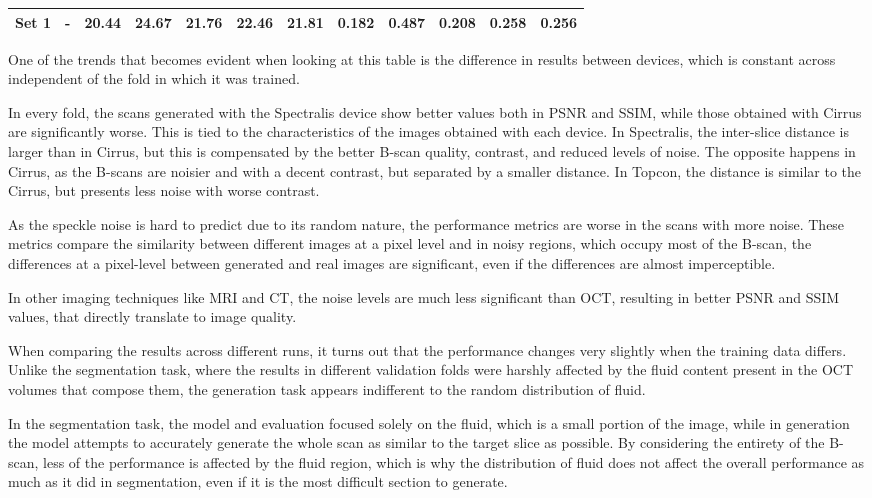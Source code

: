 \begin{table}[!ht]
{\begin{tabular}{|c|c|cccc|c|cccc|c|}
		\hline
		
		\textbf{Set 1} & - & \multicolumn{1}{c|}{20.44} & \multicolumn{1}{c|}{24.67} & \multicolumn{1}{c|}{21.76} & \multicolumn{1}{c|}{22.46} & 21.81 & \multicolumn{1}{c|}{0.182} & \multicolumn{1}{c|}{0.487} & \multicolumn{1}{c|}{0.208} & \multicolumn{1}{c|}{0.258} & 0.256 \\ \hline
	\end{tabular}}
	\label{tab:Experiment1Metrics}
\end{table}

One of the trends that becomes evident when looking at this table is the difference in results between devices, which is constant across independent of the fold in which it was trained.
\par
In every fold, the scans generated with the Spectralis device show better values both in PSNR and SSIM, while those obtained with Cirrus are significantly worse. This is tied to the characteristics of the images obtained with each device. In Spectralis, the inter-slice distance is larger than in Cirrus, but this is compensated by the better B-scan quality, contrast, and reduced levels of noise. The opposite happens in Cirrus, as the B-scans are noisier and with a decent contrast, but separated by a smaller distance. In Topcon, the distance is similar to the Cirrus, but presents less noise with worse contrast. 
\par
As the speckle noise is hard to predict due to its random nature, the performance metrics are worse in the scans with more noise. These metrics compare the similarity between different images at a pixel level and in noisy regions, which occupy most of the B-scan, the differences at a pixel-level between generated and real images are significant, even if the differences are almost imperceptible.
\par
In other imaging techniques like MRI and CT, the noise levels are much less significant than OCT, resulting in better PSNR and SSIM values, that directly translate to image quality.
\par
When comparing the results across different runs, it turns out that the performance changes very slightly when the training data differs. Unlike the segmentation task, where the results in different validation folds were harshly affected by the fluid content present in the OCT volumes that compose them, the generation task appears indifferent to the random distribution of fluid.
\par
In the segmentation task, the model and evaluation focused solely on the fluid, which is a small portion of the image, while in generation the model attempts to accurately generate the whole scan as similar to the target slice as possible. By considering the entirety of the B-scan, less of the performance is affected by the fluid region, which is why the distribution of fluid does not affect the overall performance as much as it did in segmentation, even if it is the most difficult section to generate.
